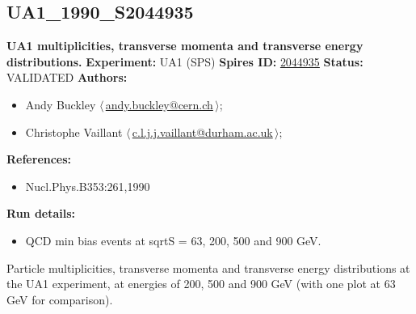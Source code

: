 \subsection[UA1\_1990\_S2044935]{UA1\_1990\_S2044935\,\cite{Albajar:1989an}}
\textbf{UA1 multiplicities, transverse momenta and transverse energy distributions.}\newline
\textbf{Experiment:} UA1 (SPS) \newline
\textbf{Spires ID:} \href{http://www.slac.stanford.edu/spires/find/hep/www?rawcmd=key+2044935}{2044935}\newline
\textbf{Status:} VALIDATED\newline
\textbf{Authors:}
\begin{itemize}
  \item Andy Buckley $\langle\,$\href{mailto:andy.buckley@cern.ch}{andy.buckley@cern.ch}$\,\rangle$;
  \item Christophe Vaillant $\langle\,$\href{mailto:c.l.j.j.vaillant@durham.ac.uk}{c.l.j.j.vaillant@durham.ac.uk}$\,\rangle$;
\end{itemize}
\textbf{References:}
\begin{itemize}
  \item Nucl.Phys.B353:261,1990
\end{itemize}
\textbf{Run details:}
\begin{itemize}

  \item QCD min bias events at sqrtS = 63, 200, 500 and 900 GeV.\end{itemize}

\noindent Particle multiplicities, transverse momenta and transverse energy distributions at the UA1 experiment, at energies of 200, 500 and 900 GeV (with one plot at 63 GeV for comparison).

\clearpage


\clearpage

